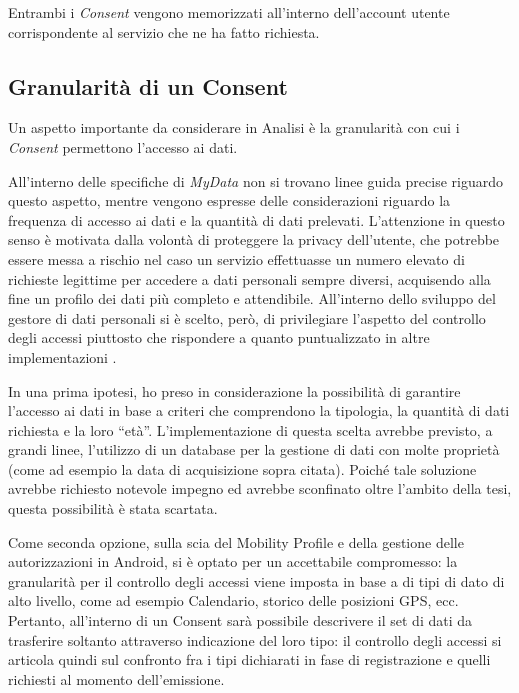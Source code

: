 Entrambi i \textit{Consent} vengono memorizzati all’interno dell’account utente corrispondente al servizio che ne ha fatto richiesta.

\subsection{Granularit\`a di un Consent}
\label{subsec:A-granularitaConsent}
Un aspetto importante da considerare in Analisi \`e la granularit\`a con cui i \textit{Consent} permettono l’accesso ai dati. 

All’interno delle specifiche di \textit{MyData} non si trovano linee guida precise riguardo questo aspetto, mentre vengono espresse delle considerazioni riguardo la frequenza di accesso ai dati e la quantit\`a di dati prelevati. L’attenzione in questo senso \`e motivata dalla volont\`a di proteggere la privacy dell’utente, che potrebbe essere messa a rischio nel caso un servizio effettuasse un numero elevato di richieste legittime per accedere a dati personali sempre diversi, acquisendo alla fine un profilo dei dati pi\`u completo e attendibile. All’interno dello sviluppo del gestore di dati personali si \`e scelto, per\`o, di privilegiare l’aspetto del controllo degli accessi piuttosto che rispondere a quanto puntualizzato in altre implementazioni \cite{githubmobilityprofile}.

In una prima ipotesi, ho preso in considerazione la possibilit\`a di garantire l’accesso ai dati in base a criteri che comprendono la tipologia, la quantit\`a di dati richiesta e la loro “et\`a”. L’implementazione di questa scelta avrebbe previsto, a grandi linee, l’utilizzo di un database per la gestione di dati con molte propriet\`a (come ad esempio la data di acquisizione sopra citata). Poich\'e tale soluzione avrebbe richiesto notevole impegno ed avrebbe sconfinato oltre l’ambito della tesi, questa possibilit\`a \`e stata scartata.

Come seconda opzione, sulla scia del Mobility Profile e della gestione delle autorizzazioni in Android, si \`e optato per un accettabile compromesso: la granularit\`a per il controllo degli accessi viene imposta in base a di tipi di dato di alto livello, come ad esempio Calendario, storico delle posizioni GPS, ecc. Pertanto, all'interno di un Consent sar\`a possibile descrivere il set di dati da trasferire soltanto attraverso indicazione del loro tipo: il controllo degli accessi si articola quindi sul confronto fra i tipi dichiarati in fase di registrazione e quelli richiesti al momento dell'emissione.

